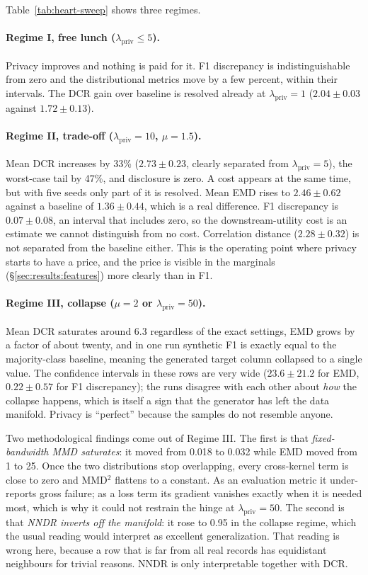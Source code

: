 \documentclass[11pt,a4paper]{article}
\newcommand{\lpriv}{\lambda_{\text{priv}}}
\begin{document}
Table~\ref{tab:heart-sweep} shows three regimes.

\paragraph{Regime I, free lunch ($\lpriv \le 5$).}
Privacy improves and nothing is paid for it. F1 discrepancy is
indistinguishable from zero and the distributional metrics move by a few
percent, within their intervals. The DCR gain over baseline is resolved
already at $\lpriv = 1$ ($2.04 \pm 0.03$ against $1.72 \pm 0.13$).

\paragraph{Regime II, trade-off ($\lpriv = 10$, $\mu = 1.5$).}
Mean DCR increases by 33\% ($2.73 \pm 0.23$, clearly separated from
$\lpriv = 5$), the worst-case tail by 47\%, and disclosure is zero. A cost
appears at the same time, but with five seeds only part of it is resolved.
Mean EMD rises to $2.46 \pm 0.62$ against a baseline of $1.36 \pm 0.44$, which
is a real difference. F1 discrepancy is $0.07 \pm 0.08$, an interval that
includes zero, so the downstream-utility cost is an estimate we cannot
distinguish from no cost. Correlation distance ($2.28 \pm 0.32$) is not
separated from the baseline either. This is the operating point where privacy
starts to have a price, and the price is visible in the marginals
(\S\ref{sec:results:features}) more clearly than in F1.

\paragraph{Regime III, collapse ($\mu = 2$ or $\lpriv = 50$).}
\label{sec:results:collapse}
Mean DCR saturates around 6.3 regardless of the exact settings, EMD grows by a
factor of about twenty, and in one run synthetic F1 is exactly equal to the
majority-class baseline, meaning the generated target column collapsed to a
single value. The confidence intervals in these rows are very wide
($23.6 \pm 21.2$ for EMD, $0.22 \pm 0.57$ for F1 discrepancy); the runs
disagree with each other about \emph{how} the collapse happens, which is
itself a sign that the generator has left the data manifold. Privacy is
``perfect'' because the samples do not resemble anyone.

Two methodological findings come out of Regime III. The first is that
\emph{fixed-bandwidth MMD saturates}: it moved from 0.018 to 0.032 while EMD
moved from 1 to 25. Once the two distributions stop overlapping, every
cross-kernel term is close to zero and MMD$^2$ flattens to a constant. As an
evaluation metric it under-reports gross failure; as a loss term its gradient
vanishes exactly when it is needed most, which is why it could not restrain
the hinge at $\lpriv = 50$. The second is that \emph{NNDR inverts off the
manifold}: it rose to 0.95 in the collapse regime, which the usual reading
would interpret as excellent generalization. That reading is wrong here,
because a row that is far from all real records has equidistant neighbours for
trivial reasons. NNDR is only interpretable together with DCR.
\end{document}
